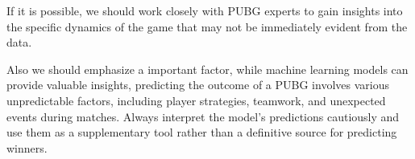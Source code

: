 \documentclass[12pt]{article}
\begin{document}
If it is possible, we should work closely with PUBG experts to gain insights into the specific dynamics of the game that may not be immediately evident from the data.

Also we should emphasize a important factor, while machine learning models can provide valuable insights, predicting the outcome of a PUBG  involves various unpredictable factors, including player strategies, teamwork, and unexpected events during matches. Always interpret the model's predictions cautiously and use them as a supplementary tool rather than a definitive source for predicting winners.




\end{document}
